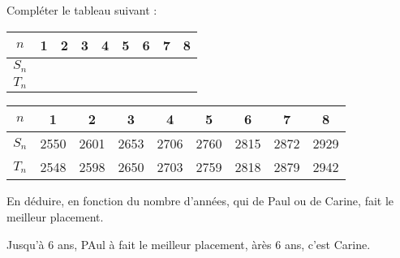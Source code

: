 \begin{questions}
	\question[1] Compléter le tableau suivant :
	
	\begin{center}
		
		\begin{tabular}{|@{$\quad $}c@{$\quad $}| @{$\qquad $}c@{$\qquad $} | @{$\qquad $}c@{$\qquad $} | @{$\qquad $}c@{$\qquad $} | @{$\qquad $}c@{$\qquad $} |@{$\qquad $}c@{$\qquad $} |@{$\qquad $}c@{$\qquad $} |@{$\qquad $}c@{$\qquad $}|@{$\qquad $}c@{$\qquad $}|}
			\hline
			$n$                           & 1 & 2 & 3 & 4 & 5 & 6 & 7 & 8 \\ \hline
			$S_n$ &   &   &   &   &   &   &   &   \\ \hline
			$T_n$ &   &   &   &   &   &   &   &   \\ \hline
		\end{tabular}
	\end{center}

	\begin{solution}
		\begin{small}
			
		\begin{center}
			
			\begin{tabular}{|@{$\quad $}c@{$\quad $}| @{\ }c@{\ } | @{\ }c@{\ } | @{\ }c@{\ } | @{\ }c@{\ } |@{\ }c@{\ } |@{\ }c@{\ } |@{\ }c@{\ }|@{\ }c@{\ }|}
				\hline
				$n$                           & 1 & 2 & 3 & 4 & 5 & 6 & 7 & 8 \\ \hline
				$S_n$ & 2550  & 2601  & 2653  & 2706  & 2760  & 2815  & 2872  & 2929  \\ \hline
				$T_n$ &  2548 &  2598 &  2650 &  2703 &  2759 &  2818 &  2879 &  2942 \\ \hline
			\end{tabular}
		\end{center}
		\end{small}
	\end{solution}
	
	\question[1] En déduire, en fonction du nombre d'années, qui de Paul ou de Carine, fait le meilleur placement.
	\begin{solution}
		Jusqu'à 6 ans, PAul à fait le meilleur placement, àrès 6 ans, c'est Carine.
	\end{solution}
	
\end{questions}